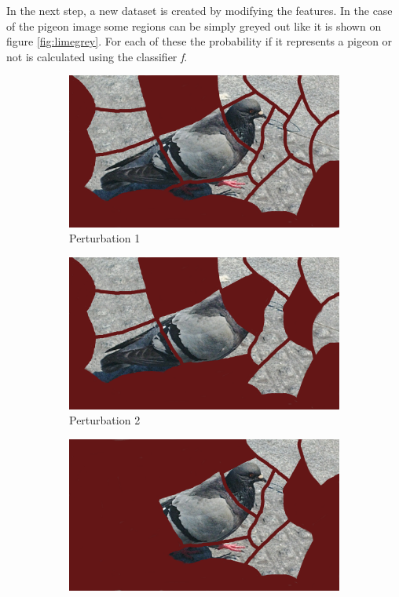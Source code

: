 In the next step, a new dataset is created by modifying the features. In the case of the pigeon image some regions can be simply greyed out like it is shown on figure \ref{fig:limegrey}. For each of these the probability if it represents a pigeon or not is calculated using the classifier \textit{f}.

\begin{figure}[H]
    \centering
    \begin{subfigure}[t]{0.32\linewidth}
        \centering
        \includegraphics[width=\linewidth]{images/lime/pert1}
        \caption{Perturbation 1}
    \end{subfigure}
    \begin{subfigure}[t]{0.32\linewidth}
        \centering
        \includegraphics[width=\linewidth]{images/lime/pert2}
        \caption{Perturbation 2}
    \end{subfigure}
    \begin{subfigure}[t]{0.32\linewidth}
        \centering
        \includegraphics[width=\linewidth]{images/lime/pert3}

\end{subfigure}
\end{figure}
